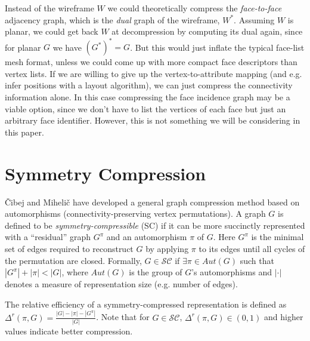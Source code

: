 \documentclass{egpubl}
\begin{document}
Instead of the wireframe $W$ we could theoretically compress the \textit{face-to-face} 
adjacency graph, which is the \textit{dual} graph of the wireframe, $W^*$. Assuming $W$ is planar, we could get back $W$ at decompression by computing its dual again, since for planar $G$ we have $(G^*)^* = G$.
But this would just inflate the typical face-list mesh format, unless we could come up with more compact face descriptors than vertex lists.
If we are willing to give up the vertex-to-attribute mapping (and e.g. infer positions with a layout algorithm), we can just compress the connectivity information alone. In this case compressing the face incidence graph may be a viable option, since we don't have to list the vertices of each face but just an arbitrary face identifier.
However, this is not something we will be considering in this paper. 


\section{Symmetry Compression}

Čibej and Mihelič \cite{cibej2021automorphisms} have developed a general graph compression method based on automorphisms (connectivity-preserving vertex permutations).
A graph $G$ is defined to be \textit{symmetry-compressible} (SC)
if it can be more succinctly represented with a ``residual'' graph $G^\pi$ and an automorphism  $\pi$ of $G$. Here $G^\pi$ is the minimal set of edges required to reconstruct $G$ by applying $\pi$ to its edges until all cycles of the permutation are closed.
Formally, $G \in \mathcal{S}\mathcal{C}$ if $\exists \pi \in Aut(G)$ such that $|G^\pi| + |\pi| < |G|$, where $Aut(G)$ is the group of $G$'s automorphisms and $|\cdot|$ denotes a measure of representation size (e.g. number of edges). 

The relative efficiency of a symmetry-compressed representation is defined as
$\Delta^r(\pi, G) = \frac{|G| - |\pi| - |G^\pi|}{|G|}$.
Note that for $G \in \mathcal{S}\mathcal{C}$, $\Delta^r(\pi, G) \in (0, 1)$ and higher values indicate better compression.
\end{document}
